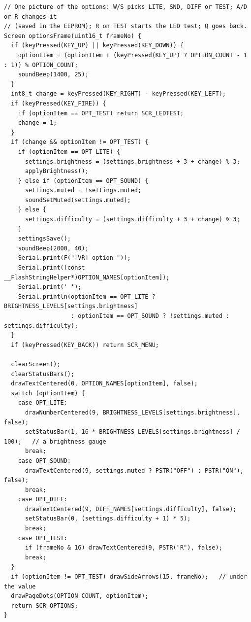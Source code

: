 \documentclass[11pt,a4paper]{article}
\begin{document}
\begin{lstlisting}[language=Arduino]
// One picture of the options: W/S picks LITE, SND, DIFF or TEST; A/D or R changes it
// (saved in the EEPROM); R on TEST starts the LED test; Q goes back.
Screen optionsFrame(uint16_t frameNo) {
  if (keyPressed(KEY_UP) || keyPressed(KEY_DOWN)) {
    optionItem = (optionItem + (keyPressed(KEY_UP) ? OPTION_COUNT - 1 : 1)) % OPTION_COUNT;
    soundBeep(1400, 25);
  }
  int8_t change = keyPressed(KEY_RIGHT) - keyPressed(KEY_LEFT);
  if (keyPressed(KEY_FIRE)) {
    if (optionItem == OPT_TEST) return SCR_LEDTEST;
    change = 1;
  }
  if (change && optionItem != OPT_TEST) {
    if (optionItem == OPT_LITE) {
      settings.brightness = (settings.brightness + 3 + change) % 3;
      applyBrightness();
    } else if (optionItem == OPT_SOUND) {
      settings.muted = !settings.muted;
      soundSetMuted(settings.muted);
    } else {
      settings.difficulty = (settings.difficulty + 3 + change) % 3;
    }
    settingsSave();
    soundBeep(2000, 40);
    Serial.print(F("[VR] option "));
    Serial.print((const __FlashStringHelper*)OPTION_NAMES[optionItem]);
    Serial.print(' ');
    Serial.println(optionItem == OPT_LITE ? BRIGHTNESS_LEVELS[settings.brightness]
                   : optionItem == OPT_SOUND ? !settings.muted : settings.difficulty);
  }
  if (keyPressed(KEY_BACK)) return SCR_MENU;

  clearScreen();
  clearStatusBars();
  drawTextCentered(0, OPTION_NAMES[optionItem], false);
  switch (optionItem) {
    case OPT_LITE:
      drawNumberCentered(9, BRIGHTNESS_LEVELS[settings.brightness], false);
      setStatusBar(1, 16 * BRIGHTNESS_LEVELS[settings.brightness] / 100);   // a brightness gauge
      break;
    case OPT_SOUND:
      drawTextCentered(9, settings.muted ? PSTR("OFF") : PSTR("ON"), false);
      break;
    case OPT_DIFF:
      drawTextCentered(9, DIFF_NAMES[settings.difficulty], false);
      setStatusBar(0, (settings.difficulty + 1) * 5);
      break;
    case OPT_TEST:
      if (frameNo & 16) drawTextCentered(9, PSTR("R"), false);
      break;
  }
  if (optionItem != OPT_TEST) drawSideArrows(15, frameNo);   // under the value
  drawPageDots(OPTION_COUNT, optionItem);
  return SCR_OPTIONS;
}


\end{lstlisting}
\end{document}
